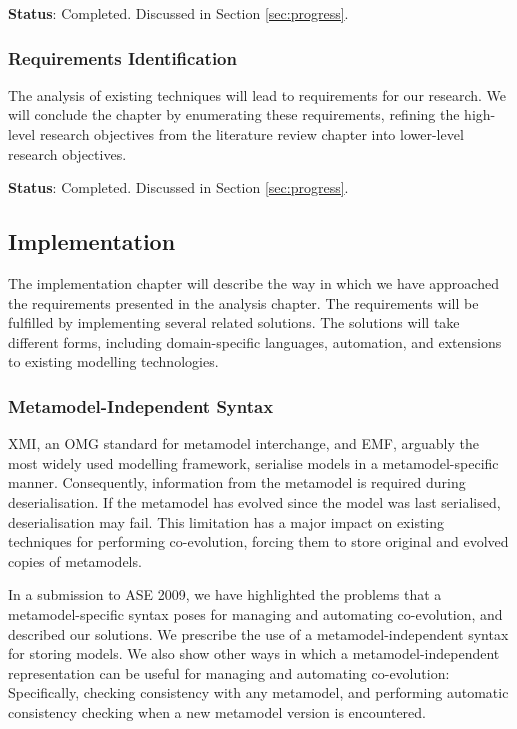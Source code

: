 \textbf{Status}: Completed. Discussed in Section \ref{sec:progress}.


\subsubsection{Requirements Identification}
The analysis of existing techniques will lead to requirements for our research. We will conclude the chapter by enumerating these requirements, refining the high-level research objectives from the literature review chapter into lower-level research objectives.

\textbf{Status}: Completed. Discussed in Section \ref{sec:progress}.


\subsection{Implementation}
The implementation chapter will describe the way in which we have approached the requirements presented in the analysis chapter. The requirements will be fulfilled by implementing several related solutions. The solutions will take different forms, including domain-specific languages, automation, and extensions to existing modelling technologies.

\subsubsection{Metamodel-Independent Syntax}
\label{subsubsec:mmi}
XMI, an OMG standard for metamodel interchange, and EMF, arguably the most widely used modelling framework, serialise models in a metamodel-specific manner. Consequently, information from the metamodel is required during deserialisation. If the metamodel has evolved since the model was last serialised, deserialisation may fail. This limitation has a major impact on existing techniques for performing co-evolution, forcing them to store original and evolved copies of metamodels. 

In a submission to ASE 2009, we have highlighted the problems that a metamodel-specific syntax poses for managing and automating co-evolution, and described our solutions. We prescribe the use of a metamodel-independent syntax for storing models. We also show other ways in which a metamodel-independent representation can be useful for managing and automating co-evolution: Specifically, checking consistency with any metamodel, and performing automatic consistency checking when a new metamodel version is encountered.

